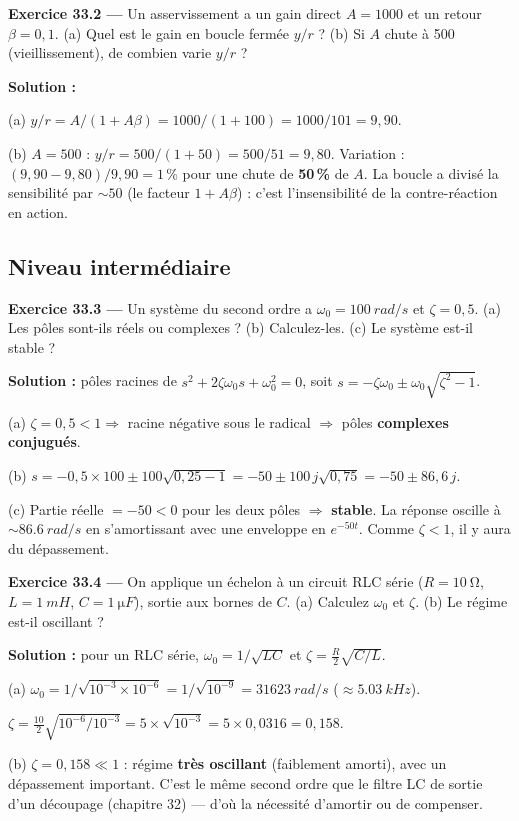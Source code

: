 \documentclass[12pt,a4paper,twoside]{book}
\begin{document}
\textbf{Exercice 33.2 ---} Un asservissement a un gain direct $A = 1000$ et un retour $\beta = 0{,}1$. (a) Quel est le gain en boucle fermée $y/r$ ? (b) Si $A$ chute à 500 (vieillissement), de combien varie $y/r$ ?

\begin{pratique}
\textbf{Solution :}

(a) $y/r = A/(1+A\beta) = 1000/(1+100) = 1000/101 = 9{,}90$.

(b) $A = 500$ : $y/r = 500/(1+50) = 500/51 = 9{,}80$. Variation : $(9{,}90-9{,}80)/9{,}90 = 1\,\%$ pour une chute de \textbf{50\,\%} de $A$. La boucle a divisé la sensibilité par $\sim 50$ (le facteur $1+A\beta$) : c'est l'insensibilité de la contre-réaction en action.
\end{pratique}

\subsection*{Niveau intermédiaire}

\textbf{Exercice 33.3 ---} Un système du second ordre a $\omega_0 = \SI{100}{rad/s}$ et $\zeta = 0{,}5$. (a) Les pôles sont-ils réels ou complexes ? (b) Calculez-les. (c) Le système est-il stable ?

\begin{pratique}
\textbf{Solution :} pôles racines de $s^2 + 2\zeta\omega_0 s + \omega_0^2 = 0$, soit $s = -\zeta\omega_0 \pm \omega_0\sqrt{\zeta^2-1}$.

(a) $\zeta = 0{,}5 < 1 \Rightarrow$ racine négative sous le radical $\Rightarrow$ pôles \textbf{complexes conjugués}.

(b) $s = -0{,}5\times100 \pm 100\sqrt{0{,}25-1} = -50 \pm 100\,j\sqrt{0{,}75} = -50 \pm 86{,}6\,j$.

(c) Partie réelle $= -50 < 0$ pour les deux pôles $\Rightarrow$ \textbf{stable}. La réponse oscille à $\sim\SI{86.6}{rad/s}$ en s'amortissant avec une enveloppe en $e^{-50t}$. Comme $\zeta < 1$, il y aura du dépassement.
\end{pratique}

\textbf{Exercice 33.4 ---} On applique un échelon à un circuit RLC série ($R = \SI{10}{\ohm}$, $L = \SI{1}{mH}$, $C = \SI{1}{\micro F}$), sortie aux bornes de $C$. (a) Calculez $\omega_0$ et $\zeta$. (b) Le régime est-il oscillant ?

\begin{pratique}
\textbf{Solution :} pour un RLC série, $\omega_0 = 1/\sqrt{LC}$ et $\zeta = \frac{R}{2}\sqrt{C/L}$.

(a) $\omega_0 = 1/\sqrt{10^{-3}\times10^{-6}} = 1/\sqrt{10^{-9}} = \SI{31623}{rad/s}$ ($\approx \SI{5.03}{kHz}$).

$\zeta = \frac{10}{2}\sqrt{10^{-6}/10^{-3}} = 5\times\sqrt{10^{-3}} = 5\times0{,}0316 = 0{,}158$.

(b) $\zeta = 0{,}158 \ll 1$ : régime \textbf{très oscillant} (faiblement amorti), avec un dépassement important. C'est le même second ordre que le filtre LC de sortie d'un découpage (chapitre 32) --- d'où la nécessité d'amortir ou de compenser.
\end{pratique}
\end{document}
